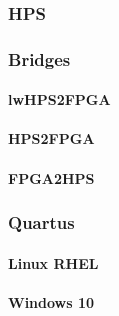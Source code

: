 		\subsubsection{HPS}
		\subsubsection{Bridges}
			\paragraph{lwHPS2FPGA}
			\paragraph{HPS2FPGA}
			\paragraph{FPGA2HPS}
		\subsubsection{Quartus}
			\paragraph{Linux RHEL}
			\paragraph{Windows 10}